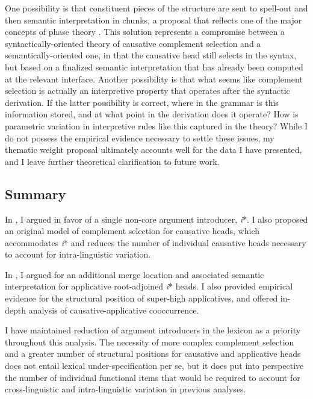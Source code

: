 \documentclass[output=paper,modfonts,nonflat,colorlinks,citecolor=brown]{langsci/langscibook}
\begin{document}
One possibility is that constituent pieces of the structure are sent to spell-out and then semantic interpretation in chunks, a proposal that reflects one of the major concepts of phase theory \citep{Chomsky1999}. This solution represents a compromise between a syntactically-oriented theory of causative complement selection and a semantically-oriented one, in that the causative head still selects in the syntax, but based on a finalized semantic interpretation that has already been computed at the relevant interface. Another possibility is that what seems like complement selection is actually an interpretive property that operates after the syntactic derivation. If the latter possibility is correct, where in the grammar is this information stored, and at what point in the derivation does it operate? How is parametric variation in interpretive rules like this captured in the theory? While I do not possess the empirical evidence necessary to settle these issues, my thematic weight proposal ultimately accounts well for the data I have presented, and I leave further theoretical clarification to future work.

\subsection{Summary}\label{sec:wechsler:4.4}

In , I argued in favor of a single non-core argument introducer, \textit{i}*. I also proposed an original model of complement selection for causative heads, which accommodates \textit{i}* and reduces the number of individual causative heads necessary to account for intra-linguistic variation.

In , I argued for an additional merge location and associated semantic interpretation for applicative root-adjoined \textit{i}* heads. I also provided empirical evidence for the structural position of super-high applicatives, and offered in-depth analysis of causative-applicative cooccurrence.

I have maintained reduction of argument introducers in the lexicon as a priority throughout this analysis. The necessity of more complex complement selection and a greater number of structural positions for causative and applicative heads does not entail lexical under-specification per se, but it does put into perspective the number of individual functional items that would be required to account for cross-linguistic and intra-linguistic variation in previous analyses.
\end{document}
